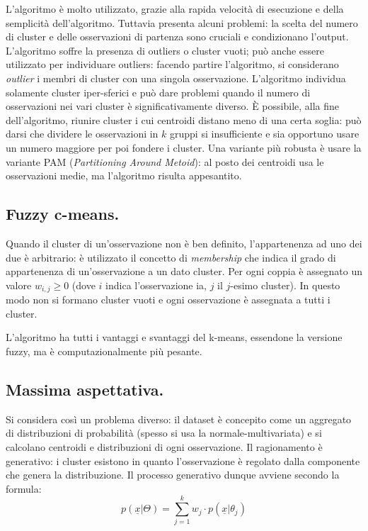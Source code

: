 \documentclass[11pt, a4page, twocolumn]{article}
\begin{document}
L'algoritmo è molto utilizzato, grazie alla rapida velocità di esecuzione e della semplicità dell'algoritmo.
Tuttavia presenta alcuni problemi: la scelta del numero di cluster e delle osservazioni di partenza sono cruciali e condizionano l'output.
L'algoritmo soffre la presenza di outliers o cluster vuoti; può anche essere utilizzato per individuare outliers: facendo partire l'algoritmo, si considerano \textit{outlier} i membri di cluster con una singola osservazione.
L'algoritmo individua solamente cluster iper-sferici e può dare problemi quando il numero di osservazioni nei vari cluster è significativamente diverso.
È possibile, alla fine dell'algoritmo, riunire cluster i cui centroidi distano meno di una certa soglia: può darsi che dividere le osservazioni in $k$ gruppi si insufficiente e sia opportuno usare un numero maggiore per poi fondere i cluster.
Una variante più robusta è usare la variante PAM (\textit{Partitioning Around Metoid}): al posto dei centroidi usa le osservazioni medie, ma l'algoritmo risulta appesantito.

\subsection{Fuzzy c-means.}
Quando il cluster di un'osservazione non è ben definito, l'appartenenza ad uno dei due è arbitrario: è utilizzato il concetto di \textit{membership} che indica il grado di appartenenza di un'osservazione a un dato cluster.
Per ogni coppia è assegnato un valore $w_{i,j} \ge 0$ (dove $i$ indica l'osservazione ia, $j$ il $j$-esimo cluster).
In questo modo non si formano cluster vuoti e ogni osservazione è assegnata a tutti i cluster.

L'algoritmo ha tutti i vantaggi e svantaggi del k-means, essendone la versione fuzzy, ma è computazionalmente più pesante.

\subsection{Massima aspettativa.}
Si considera così un problema diverso: il dataset è concepito come un aggregato di distribuzioni di probabilità (spesso si usa la normale-multivariata) e si calcolano centroidi e distribuzioni di ogni osservazione.
Il ragionamento è generativo: i cluster esistono in quanto l'osservazione è regolato dalla componente che genera la distribuzione.
Il processo generativo dunque avviene secondo la formula:
\begin{equation*}
p(\underline{x}|\Theta) = \sum^k_{j=1}{w_j \cdot p(\underline{x}|\theta_j)}
\end{equation*}
\end{document}
